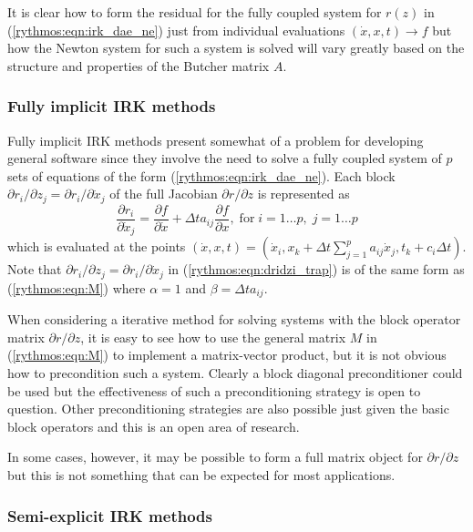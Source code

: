 \documentclass[pdf,ps2pdf,11pt]{SANDreport}
\begin{document}
It is clear how to form the residual for the fully coupled system for $r(z)$ in
(\ref{rythmos:eqn:irk_dae_ne}) just from individual evaluations $(\dot{x},x,t)
{}\rightarrow f$ but how the Newton system for such a system is solved will
vary greatly based on the structure and properties of the Butcher matrix $A$.

\subsubsection*{Fully implicit IRK methods}

Fully implicit IRK methods present somewhat of a problem for developing
general software since they involve the need to solve a fully coupled system
of $p$ sets of equations of the form (\ref{rythmos:eqn:irk_dae_ne}).  Each
block ${}\partial r_i / {}\partial z_j = {}\partial r_i / {}\partial
{}\dot{x}_j$ of the full Jacobian ${}\partial r / {}\partial z$ is represented
as
%
\begin{equation}
\frac{\partial r_i}{\partial \dot{x}_j}
= \frac{\partial f}{\partial \dot{x}}
+ \Delta t a_{ij} \frac{\partial f}{\partial x},
\; \mbox{for} \; i = 1 \ldots p, \; j = 1 \ldots p
\label{rythmos:eqn:dridzi_trap}
\end{equation}
%
which is evaluated at the points $(\dot{x},x,t) = ( {}\dot{x}_i, x_k +
{}\Delta t {}\sum_{j=1}^{p} a_{ij} {}\dot{x}_j, t_k + c_i {}\Delta t )$.  Note
that ${}\partial r_i / {}\partial z_j = {}\partial r_i / {}\partial
{}\dot{x}_j$ in (\ref{rythmos:eqn:dridzi_trap}) is of the same form as
(\ref{rythmos:eqn:M}) where $\alpha = 1$ and $\beta = \Delta t a_{ij}$.

When considering a iterative method for solving systems with the block
operator matrix ${}\partial r / {}\partial z$, it is easy to see how to use
the general matrix $M$ in (\ref{rythmos:eqn:M}) to implement a matrix-vector
product, but it is not obvious how to precondition such a system.  Clearly a
block diagonal preconditioner could be used but the effectiveness of such a
preconditioning strategy is open to question.  Other preconditioning strategies
are also possible just given the basic block operators and this is an open
area of research.

In some cases, however, it may be possible to form a full matrix object for
${}\partial r / {}\partial z$ but this is not something that can be expected
for most applications.

\subsubsection*{Semi-explicit IRK methods}
\end{document}
